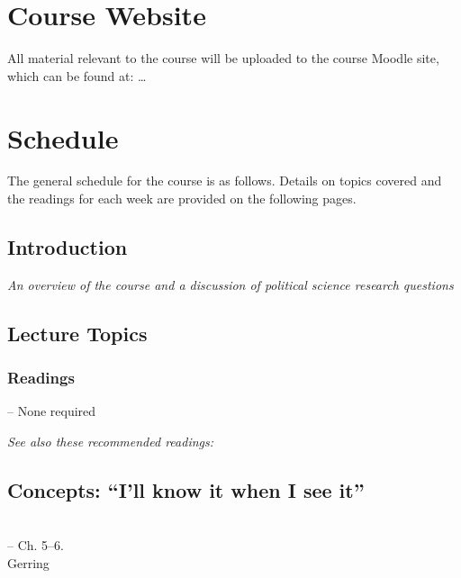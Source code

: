 \documentclass[12pt,a4paper]{article}
\newcommand{\lecture}[3][\DefaultOpt]{%
  \def\DefaultOpt{#2}%
  \clearpage\subsection[#1]{#2}\emph{#3}\vspace{.25em}\\
}
\newcommand{\reading}[2][]{\noindent -- {#1}\bibentry{#2}.\vspace{.25em}\\}
\newcommand{\textbook}[2][]{\noindent -- {#1}#2.\vspace{.25em}\\}
\newcommand{\thomas}{\vspace{1em}\noindent Instructor: Thomas\\}
\newcommand{\seealso}{\noindent \emph{See also these recommended readings:}}
\begin{document}
\section{Course Website}

All material relevant to the course will be uploaded to the course Moodle site, which can be found at: \dots


\clearpage
\section{Schedule}
The general schedule for the course is as follows. Details on topics covered and the readings for each week are provided on the following pages.

\secttoc

\clearpage





\lecture{Introduction}{An overview of the course and a discussion of political science research questions}


\subsection*{Lecture Topics}

\begin{itemize*}
\item 
\end{itemize*}

\subsubsection*{Readings}

-- None required

\seealso



\lecture{Concepts: ``I'll know it when I see it''}{}
\textbook{Ch. 5--6}{Gerring}
\end{document}
